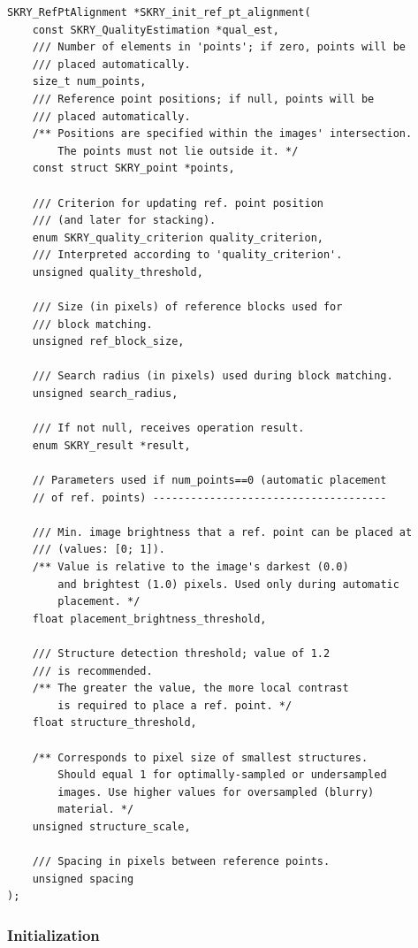 \documentclass[12pt]{article}
\begin{document}
\begin{lstlisting}[caption={Reference point alignment ({\ttfamily{ref\_pt\_align.h/.c}})}]
SKRY_RefPtAlignment *SKRY_init_ref_pt_alignment(
    const SKRY_QualityEstimation *qual_est,
    /// Number of elements in 'points'; if zero, points will be
    /// placed automatically.
    size_t num_points,
    /// Reference point positions; if null, points will be
    /// placed automatically.
    /** Positions are specified within the images' intersection.
        The points must not lie outside it. */
    const struct SKRY_point *points,

    /// Criterion for updating ref. point position
    /// (and later for stacking).
    enum SKRY_quality_criterion quality_criterion,
    /// Interpreted according to 'quality_criterion'.
    unsigned quality_threshold,

    /// Size (in pixels) of reference blocks used for
    /// block matching.
    unsigned ref_block_size,

    /// Search radius (in pixels) used during block matching.
    unsigned search_radius,

    /// If not null, receives operation result.
    enum SKRY_result *result,

    // Parameters used if num_points==0 (automatic placement
    // of ref. points) -------------------------------------

    /// Min. image brightness that a ref. point can be placed at
    /// (values: [0; 1]).
    /** Value is relative to the image's darkest (0.0)
        and brightest (1.0) pixels. Used only during automatic
        placement. */
    float placement_brightness_threshold,

    /// Structure detection threshold; value of 1.2
    /// is recommended.
    /** The greater the value, the more local contrast
        is required to place a ref. point. */
    float structure_threshold,

    /** Corresponds to pixel size of smallest structures.
        Should equal 1 for optimally-sampled or undersampled
        images. Use higher values for oversampled (blurry)
        material. */
    unsigned structure_scale,

    /// Spacing in pixels between reference points.
    unsigned spacing
);
\end{lstlisting}

\subsubsection{Initialization}
\end{document}
